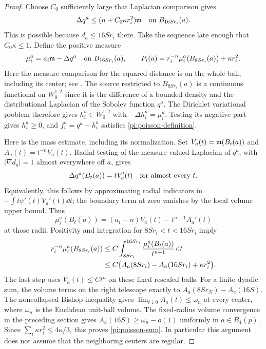 \begin{proof}
Choose $C_0$ sufficiently large that Laplacian comparison gives
\[
 \Delta q^a\le(n+C_0\kappa r_i^2)\mathfrak m
 \quad\hbox{on }B_{16Sr_i}(a).
\]
This is possible because $d_a\le16Sr_i$ there.  Take the sequence
late enough that $C_0\kappa\le1$.  Define the positive measure
\[
 \mu_i^a=a_i\mathfrak m-\Delta q^a
 \quad\hbox{on }B_{16Sr_i}(a),
 \qquad
 P_i(a)=r_i^{-n}\mu_i^a(B_{8Sr_i}(a))+\kappa r_i^2.
\]
Here the measure comparison for the squared distance is on the
whole ball, including its center; see
\cite[Corollary~5.15, equation~(5.29)]{Gigli15}.
The source restricted to $B_{8Sr_i}(a)$ is a continuous functional
on $W^{1,2}_0$ since it is the difference of a bounded density and
the distributional Laplacian of the Sobolev function $q^a$.
The Dirichlet variational problem therefore gives
$h_i^a\in W^{1,2}_0$ with $-\Delta h_i^a=\mu_i^a$.
Testing its negative part gives $h_i^a\ge0$, and
$f_i^a=q^a-h_i^a$ satisfies \eqref{pi:poisson-definition}.

Here is the mass estimate, including its normalization.  Set
$V_a(t)=\mathfrak m(B_t(a))$ and $A_a(t)=t^{-n}V_a(t)$.  Radial testing of
the measure-valued Laplacian of $q^a$, with $|\nabla d_a|=1$
almost everywhere off $a$, gives
\[
 \Delta q^a(B_t(a))=tV_a'(t)
 \quad\hbox{for almost every }t.
\]
Equivalently, this follows by approximating radial indicators in
$-\int t\psi'(t)V_a'(t)\dd t$; the boundary term at zero vanishes
by the local volume upper bound.  Thus
\[
 \mu_i^a(B_t(a))=(a_i-n)V_a(t)-t^{n+1}A_a'(t)
\]
at those radii.  Positivity and integration for
$8Sr_i<t<16Sr_i$ imply
\begin{align}
 r_i^{-n}\mu_i^a(B_{8Sr_i}(a))
 &\le C\int_{8Sr_i}^{16Sr_i}
       \frac{\mu_i^a(B_t(a))}{t^{n+1}}\,\mathrm d t\notag\\
 &\le C\{A_a(8Sr_i)-A_a(16Sr_i)+\kappa r_i^2\}.
 \label{pi:volume-drop}
\end{align}
The last step uses $V_a(t)\le Ct^n$ on these fixed rescaled balls.
For a finite dyadic sum, the volume terms on the right telescope
exactly to $A_a(8Sr_N)-A_a(16S)$.  The noncollapsed Bishop inequality
gives $\lim_{t\downarrow0}A_a(t)\le\omega_n$ at every center,
where $\omega_n$ is the Euclidean unit-ball volume.  The fixed-radius
volume convergence in the preceding section gives
$A_a(16S)\ge\omega_n-o(1)$ uniformly in $a\in B_4(p)$.
Since $\sum_i\kappa r_i^2\le4\kappa/3$, this proves
\eqref{pi:poisson-sum}.  In particular this argument does not
assume that the neighboring centers are regular.


\end{proof}
